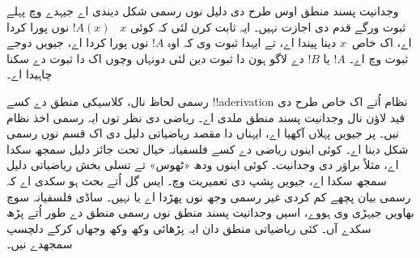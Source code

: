 \documentclass[../../../include/open-logic-chapter]{subfiles}
\begin{document}
وجدانیت پسند منطق اوس طرح دی دلیل نوں رسمی شکل دیندی اے جیہدے
وچ پہلے ثبوت ورگے قدم دی اجازت نہیں۔ ایہ ثابت کرن لئی کہ کوئی $x$
~$!A(x)$ نوں پورا کردا اے، اک خاص~$x$ دینا پیندا اے، تے ایہدا
ثبوت وی کہ اوہ $!A$ نوں پورا کردا اے، جیویں دوجے ثبوت وچ اے۔
$!A$ یا $!B$ دے لاگو ہون دا ثبوت دین لئی دونہاں وچوں اک دا ثبوت
دے سکنا چاہیدا اے۔

رسمی لحاظ نال، کلاسیکی منطق دے کسے !!a{derivation} نظام اُتے
اک خاص طرح دی قید لاؤن نال وجدانیت پسند منطق ملدی اے۔ ریاضی دی
نظر توں ایہ رسمی اخذ نظام نیں۔ پر جیویں پہلاں آکھیا اے، ایہناں
دا مقصد ریاضیاتی دلیل دی اک قسم نوں رسمی شکل دینا اے۔ کوئی
اینوں ریاضی دے کسے فلسفیانہ خیال تحت جائز دلیل سمجھ سکدا اے،
مثلاً براوَر دی وجدانیت۔ کوئی اینوں ودھ «ٹھوس» تے تسلی بخش
ریاضیاتی دلیل سمجھ سکدا اے، جیویں بِشپ دی تعمیریت وچ۔ ایس گل
اُتے بحث ہو سکدی اے کہ رسمی بیان پچھے کم کردی غیر رسمی وجھ نوں
پھڑدا اے یا نہیں۔ ساڈی فلسفیانہ سوچ بھاویں جیہڑی وی ہووے، اسیں
وجدانیت پسند منطق نوں رسمی منطق دے طور اُتے پڑھ سکدے آں۔ کئی
ریاضیاتی منطق دان ایہ پڑھائی وکھ وکھ وجھاں کرکے دلچسپ سمجھدے نیں۔
\end{document}
